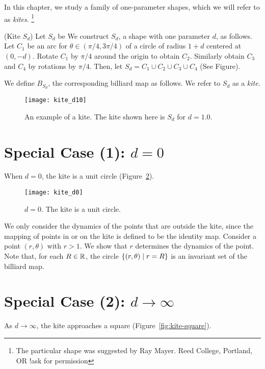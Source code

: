 \documentclass[12pt,twoside,draft]{book}
\begin{document}
In this chapter, we study a family of one-parameter shapes, which we will refer to as \textit{kites}.
\footnote{The particular shape was suggested by Ray Mayer. Reed College, Portland, OR !ask for permission}
\begin{definition}
  (Kite $S_d$)
  Let $S_d$ be 
  We construct $S_d$, a shape with one parameter $d$, as follows.
  Let $C_1$ be an arc for $\theta \in (\pi/4, 3\pi/4)$ of a circle of radius $1+d$ centered at $(0,-d)$.
  Rotate $C_1$ by $\pi/4$ around the origin to obtain $C_2$.
  Similarly obtain $C_3$ and $C_4$ by rotations by $\pi/4$.
  Then, let $S_d = C_1 \cup C_2 \cup C_3 \cup C_4$ (See Figure).

  We define $B_{S_d}$, the corresponding billiard map as follows.
  We refer to $S_d$ as a \textit{kite}.
\end{definition}
\begin{figure}[ht]
  \begin{center}
    \texttt{[image: kite\_d10]}
  \caption{An example of a kite. The kite shown here is $S_d$ for $d = 1.0$.}
  \label{fig:kiteeg}
  \end{center}
\end{figure}

\section{Special Case (1): $d = 0$}
When $d = 0$, the kite is a unit circle (Figure~\ref{fig:kite-circle}).

\begin{figure}[ht]
  \begin{center}
    \texttt{[image: kite\_d0]}
  \caption{$d = 0$. The kite is a unit circle.}
  \label{fig:kite-circle}
  \end{center}
\end{figure}

We only consider the dynamics of the points that are outside the kite, since the mapping of points in or on the kite is defined to be the identity map.
Consider a point $(r, \theta)$ with $r > 1$.
We show that $r$ determines the dynamics of the point.
Note that, for each $R \in \mathbb{R}$, the circle $\left \{ (r,\theta) \mathrel{} \middle| \mathrel{} r = R \right \}$ is an invariant set of the billiard map.

\section{Special Case (2): $d \to \infty$}
As $d \to \infty$, the kite approaches a square (Figure~\ref{fig:kite-square}).
\end{document}
